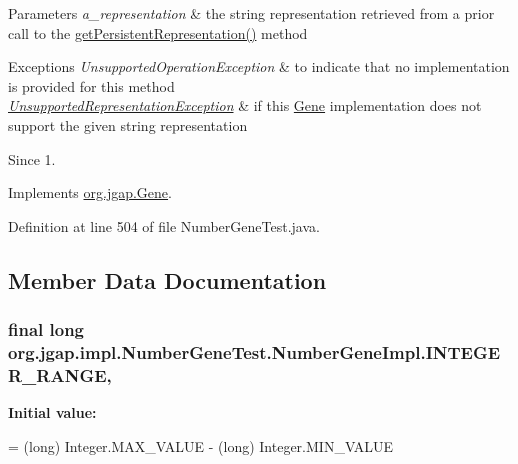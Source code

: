 \begin{DoxyParams}{Parameters}
{\em a\-\_\-representation} & the string representation retrieved from a prior call to the \hyperlink{classorg_1_1jgap_1_1impl_1_1_number_gene_test_1_1_number_gene_impl_a4650fd61d86fae144300e230de0a4c0b}{get\-Persistent\-Representation()} method\\
\hline
\end{DoxyParams}

\begin{DoxyExceptions}{Exceptions}
{\em Unsupported\-Operation\-Exception} & to indicate that no implementation is provided for this method \\
\hline
{\em \hyperlink{classorg_1_1jgap_1_1_unsupported_representation_exception}{Unsupported\-Representation\-Exception}} & if this \hyperlink{interfaceorg_1_1jgap_1_1_gene}{Gene} implementation does not support the given string representation\\
\hline
\end{DoxyExceptions}
\begin{DoxySince}{Since}
1. 
\end{DoxySince}


Implements \hyperlink{interfaceorg_1_1jgap_1_1_gene_a057e5d6cce5ae768cbf626e0ccf70520}{org.\-jgap.\-Gene}.



Definition at line 504 of file Number\-Gene\-Test.\-java.



\subsection{Member Data Documentation}
\hypertarget{classorg_1_1jgap_1_1impl_1_1_number_gene_test_1_1_number_gene_impl_a562928068f038dd348e39b41bf0d7ab4}{
\subsubsection[{I\-N\-T\-E\-G\-E\-R\-\_\-\-R\-A\-N\-G\-E}]{\setlength{\rightskip}{0pt plus 5cm}final long org.\-jgap.\-impl.\-Number\-Gene\-Test.\-Number\-Gene\-Impl.\-I\-N\-T\-E\-G\-E\-R\-\_\-\-R\-A\-N\-G\-E\hspace{0.3cm}{\ttfamily [static]}, {\ttfamily [protected]}}}\label{classorg_1_1jgap_1_1impl_1_1_number_gene_test_1_1_number_gene_impl_a562928068f038dd348e39b41bf0d7ab4}
{\bfseries Initial value\-:}
\begin{DoxyCode}
= (long) Integer.MAX\_VALUE
        - (\textcolor{keywordtype}{long}) Integer.MIN\_VALUE
\end{DoxyCode}



